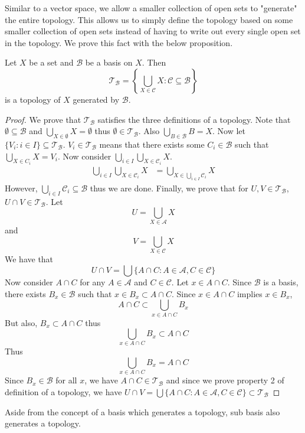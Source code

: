 \documentclass[a4paper]{article}
\begin{document}
Similar to a vector space, we allow a smaller collection of open sets to "generate" the entire topology. This allows us to simply define the topology based on some smaller collection of open sets instead of having to write out every single open set in the topology. We prove this fact with the below proposition. 

\begin{prp}{}{} Let $X$ be a set and $\mathcal{B}$ be a basis on $X$. Then $$\mathcal{T}_\mathcal{B}=\left\{\bigcup_{X\in\mathcal{C}}X:\mathcal{C}\subseteq\mathcal{B}\right\}$$ is a topology of $X$ generated by $\mathcal{B}$. 
\begin{proof} We prove that $\mathcal{T}_\mathcal{B}$ satisfies the three definitions of a topology. Note that $\emptyset\subseteq\mathcal{B}$ and $\bigcup_{X\in\emptyset}X=\emptyset$ thus $\emptyset\in\mathcal{T}_\mathcal{B}$. Also $\bigcup_{B\in\mathcal{B}}B=X$. Now let $\{V_i:i\in I\}\subseteq\mathcal{T}_\mathcal{B}$. $V_i\in\mathcal{T}_\mathcal{B}$ means that there exists some $C_i\in\mathcal{B}$ such that $\bigcup_{X\in C_i}X=V_i$. Now consider $\bigcup_{i\in I}\bigcup_{X\in\mathcal{C}_i}X$. 
\begin{align*}
\bigcup_{i\in I}\bigcup_{X\in\mathcal{C}_i}X&=\bigcup_{X\in\bigcup_{i\in I}\mathcal{C}_i}X
\end{align*} However, $\bigcup_{i\in I}\mathcal{C}_i\subseteq\mathcal{B}$ thus we are done. Finally, we prove that for $U,V\in\mathcal{T}_\mathcal{B}$, $U\cap V\in\mathcal{T}_\mathcal{B}$. Let $$U=\bigcup_{X\in\mathcal{A}}X$$ and $$V=\bigcup_{X\in\mathcal{C}}X$$ We have that $$U\cap V=\bigcup\{A\cap C:A\in\mathcal{A}, C\in\mathcal{C}\}$$ Now consider $A\cap C$ for any $A\in\mathcal{A}$ and $C\in\mathcal{C}$. Let $x\in A\cap C$. Since $\mathcal{B}$ is a basis, there exists $B_x\in\mathcal{B}$ such that $x\in B_x\subset A\cap C$. Since $x\in A\cap C$ implies $x\in B_x$, $$A\cap C\subset\bigcup_{x\in A\cap C}B_x$$ But also, $B_x\subset A\cap C$ thus $$\bigcup_{x\in A\cap C}B_x\subset A\cap C$$ Thus $$\bigcup_{x\in A\cap C}B_x=A\cap C$$ Since $B_x\in\mathcal{B}$ for all $x$, we have $A\cap C\in\mathcal{T}_\mathcal{B}$ and since we prove property 2 of definition of a topology, we have $U\cap V=\bigcup\{A\cap C:A\in\mathcal{A}, C\in\mathcal{C}\}\subset\mathcal{T}_\mathcal{B}$
\end{proof}
\end{prp}

Aside from the concept of a basis which generates a topology, sub basis also generates a topology. 
\end{document}
